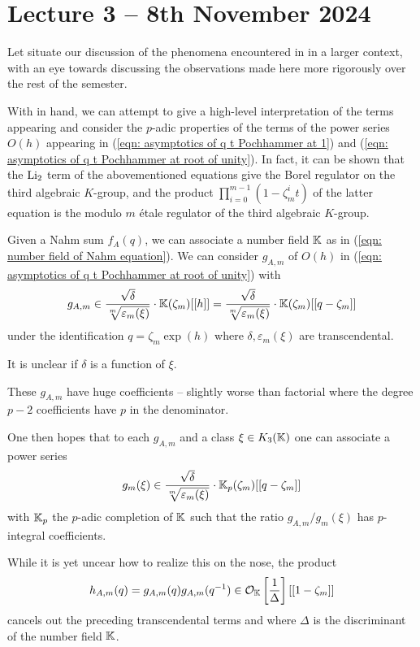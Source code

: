 \section{Lecture 3 -- 8th November 2024}\label{sec: lecture 3}
Let situate our discussion of the phenomena encountered in  in a larger context, with an eye towards discussing the observations made here more rigorously over the rest of the semester.

With  in hand, we can attempt to give a high-level interpretation of the terms appearing and consider the $p$-adic properties of the terms of the power series $O(h)$ appearing in (\ref{eqn: asymptotics of q t Pochhammer at 1}) and (\ref{eqn: asymptotics of q t Pochhammer at root of unity}). In fact, it can be shown that the $\mathrm{Li}_{2}$ term of the abovementioned equations give the Borel regulator on the third algebraic $K$-group, and the product $\prod_{i=0}^{m-1}(1-\zeta_{m}^{i}t)$ of the latter equation is the modulo $m$ \'{e}tale regulator of the third algebraic $K$-group. 

Given a Nahm sum $f_{A}(q)$, we can associate a number field $\mathbb{K}$ as in (\ref{eqn: number field of Nahm equation}). We can consider $g_{A,m}$ of $O(h)$ in (\ref{eqn: asymptotics of q t Pochhammer at root of unity}) with 
$$g_{A,m}\in \frac{\sqrt{\delta}}{\sqrt[m]{\varepsilon_{m}(\xi)}}\cdot\mathbb{K}(\zeta_{m})[[h]]=\frac{\sqrt{\delta}}{\sqrt[m]{\varepsilon_{m}(\xi)}}\cdot\mathbb{K}(\zeta_{m})[[q-\zeta_{m}]]$$
under the identification $q=\zeta_{m}\exp(h)$ where $\delta,\varepsilon_{m}(\xi)$ are transcendental. 
\begin{remark}
    It is unclear if $\delta$ is a function of $\xi$. 
\end{remark}
\begin{remark}
    These $g_{A,m}$ have huge coefficients -- slightly worse than factorial where the degree $p-2$ coefficients have $p$ in the denominator. 
\end{remark}
One then hopes that to each $g_{A,m}$ and a class $\xi\in K_{3}(\mathbb{K})$ one can associate a power series 
$$g_{m}(\xi)\in\frac{\sqrt{\delta}}{\sqrt[m]{\varepsilon_{m}(\xi)}}\cdot\mathbb{K}_{p}(\zeta_{m})[[q-\zeta_{m}]]$$
with $\mathbb{K}_{p}$ the $p$-adic completion of $\mathbb{K}$ such that the ratio $g_{A,m}/g_{m}(\xi)$ has $p$-integral coefficients. 

While it is yet uncear how to realize this on the nose, the product 
\begin{equation}\label{eqn: symmetrization}
    h_{A,m}(q)=g_{A,m}(q)g_{A,m}(q^{-1})\in\mathcal{O}_{\mathbb{K}}\left[\frac{1}{\Delta}\right][[1-\zeta_{m}]]
\end{equation}
cancels out the preceding transcendental terms and where $\Delta$ is the discriminant of the number field $\mathbb{K}$. 

